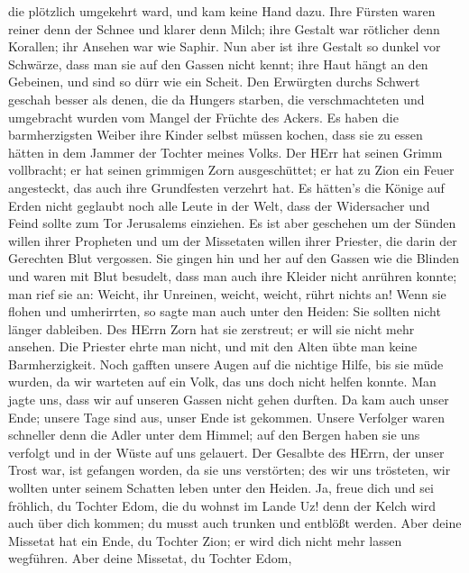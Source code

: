 die plötzlich umgekehrt ward, und kam keine Hand dazu.  Ihre
Fürsten waren reiner denn der Schnee und klarer denn Milch; ihre Gestalt
war rötlicher denn Korallen; ihr Ansehen war wie Saphir. 
Nun aber ist ihre Gestalt so dunkel vor Schwärze, dass man sie auf den
Gassen nicht kennt; ihre Haut hängt an den Gebeinen, und sind so dürr
wie ein Scheit.  Den Erwürgten durchs Schwert geschah besser
als denen, die da Hungers starben, die verschmachteten und umgebracht
wurden vom Mangel der Früchte des Ackers.  Es haben die
barmherzigsten Weiber ihre Kinder selbst müssen kochen, dass sie zu
essen hätten in dem Jammer der Tochter meines Volks.  Der
HErr hat seinen Grimm vollbracht; er hat seinen grimmigen Zorn
ausgeschüttet; er hat zu Zion ein Feuer angesteckt, das auch ihre
Grundfesten verzehrt hat.  Es hätten's die Könige auf Erden
nicht geglaubt noch alle Leute in der Welt, dass der Widersacher und
Feind sollte zum Tor Jerusalems einziehen.  Es ist aber
geschehen um der Sünden willen ihrer Propheten und um der Missetaten
willen ihrer Priester, die darin der Gerechten Blut vergossen.
 Sie gingen hin und her auf den Gassen wie die Blinden und
waren mit Blut besudelt, dass man auch ihre Kleider nicht anrühren
konnte;  man rief sie an: Weicht, ihr Unreinen, weicht,
weicht, rührt nichts an! Wenn sie flohen und umherirrten, so sagte man
auch unter den Heiden: Sie sollten nicht länger dableiben. 
Des HErrn Zorn hat sie zerstreut; er will sie nicht mehr ansehen. Die
Priester ehrte man nicht, und mit den Alten übte man keine
Barmherzigkeit.  Noch gafften unsere Augen auf die nichtige
Hilfe, bis sie müde wurden, da wir warteten auf ein Volk, das uns doch
nicht helfen konnte.  Man jagte uns, dass wir auf unseren
Gassen nicht gehen durften. Da kam auch unser Ende; unsere Tage sind
aus, unser Ende ist gekommen.  Unsere Verfolger waren
schneller denn die Adler unter dem Himmel; auf den Bergen haben sie uns
verfolgt und in der Wüste auf uns gelauert.  Der Gesalbte
des HErrn, der unser Trost war, ist gefangen worden, da sie uns
verstörten; des wir uns trösteten, wir wollten unter seinem Schatten
leben unter den Heiden.  Ja, freue dich und sei fröhlich,
du Tochter Edom, die du wohnst im Lande Uz! denn der Kelch wird auch
über dich kommen; du musst auch trunken und entblößt werden.
 Aber deine Missetat hat ein Ende, du Tochter Zion; er wird
dich nicht mehr lassen wegführen. Aber deine Missetat, du Tochter Edom,

